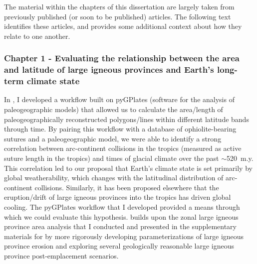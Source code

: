 \documentclass{ucbthesis}
\begin{document}
\begin{frontmatter}


\tableofcontents
\clearpage
\listoffigures
\clearpage
\listoftables


\begin{preface}

The material within the chapters of this dissertation are largely taken from previously published (or soon to be published) articles. The following text identifies these articles, and provides some additional context about how they relate to one another.

\subsubsection*{Chapter 1 - Evaluating the relationship between the area and latitude of large igneous provinces and Earth's long-term climate state}

\noindent
{}

\medskip

\noindent
{}

\bigskip

In \citet{Macdonald2019a}, I developed a workflow built on pyGPlates (software for the analysis of paleogeographic models) that allowed us to calculate the area/length of paleogeographically reconstructed polygons/lines within different latitude bands through time. By pairing this workflow with a database of ophiolite-bearing sutures and a paleogeographic model, we were able to identify a strong correlation between arc-continent collisions in the tropics (measured as active suture length in the tropics) and times of glacial climate over the past $\sim$520~m.y. This correlation led to our proposal that Earth's climate state is set primarily by global weatherability, which changes with the latitudinal distribution of arc-continent collisions. Similarly, it has been proposed elsewhere that the eruption/drift of large igneous provinces into the tropics has driven global cooling. The pyGPlates workflow that I developed provided a means through which we could evaluate this hypothesis. \citet{Park2019a} builds upon the zonal large igneous province area analysis that I conducted and presented in the supplementary materials for \citet{Macdonald2019a} by more rigorously developing parameterizations of large igneous province erosion and exploring several geologically reasonable large igneous province post-emplacement scenarios.


\end{preface}
\end{frontmatter}
\end{document}
